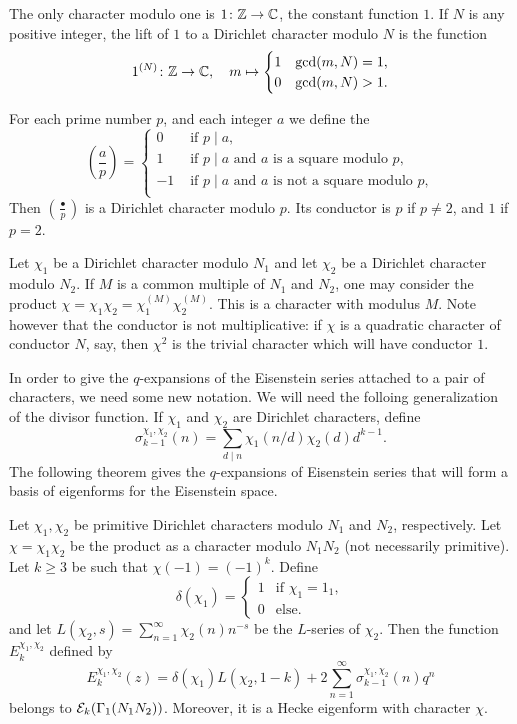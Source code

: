 \begin{example}
  The only character modulo one is $1\colon \mathbb{Z}\to\mathbb{C}$, the constant function $1$. If $N$ is any positive integer, the lift of $1$ to a Dirichlet character modulo $N$ is the function
\[
1^{(N)}\colon\mathbb{Z}\to\mathbb{C},\quad m\mapsto \begin{cases}1&\gcd(m,N)=1,\\0&\gcd(m,N)>1.
\end{cases}
\]
\end{example}
\begin{example}
  For each prime number $p$, and each integer $a$ we define the 
\[
\left(\frac a p\right)=\begin{cases}
0&\text{ if }p\mid a,\\
1&\text{ if }p\mid a\text{ and $a$ is a square modulo $p$},\\
-1&\text{ if }p\mid a\text{ and $a$ is not a square modulo $p$},\\
\end{cases}
\]
Then $\left(\frac\bullet p\right)$ is a Dirichlet character modulo $p$. Its conductor is $p$ if $p\neq 2$, and  $1$ if $p=2$.
\end{example}

\begin{example}
  Let $\chi_1$ be a Dirichlet character modulo $N_1$ and let $\chi_2$ be a Dirichlet character modulo $N_2$. If $M$ is a common multiple of $N_1$ and $N_2$, one may consider the product $\chi=\chi_1\chi_2 = \chi_1^{(M)}\chi_2^{(M)}$. This is a character with modulus $M$. Note however that the conductor is not multiplicative: if $\chi$ is a quadratic character of conductor $N$, say, then $\chi^2$ is the trivial character which will have conductor $1$.
\end{example}

In order to give the $q$-expansions of the Eisenstein series attached to a pair of characters, we need some new notation. We will need the folloing generalization of the divisor function. If $\chi_1$ and $\chi_2$ are Dirichlet characters, define
\[
\sigma_{k-1}^{\chi_1,\chi_2}(n)=\sum_{d\mid n}\chi_1(n/d)\chi_2(d)d^{k-1}.
\]
The following theorem gives the $q$-expansions of Eisenstein series that will form a basis of eigenforms for the Eisenstein space.
\begin{theorem}
\label{th:eisenstein-gamma1}
  Let $\chi_1,\chi_2$ be primitive Dirichlet characters modulo $N_1$ and $N_2$, respectively. Let $\chi=\chi_1\chi_2$ be the product as a character modulo $N_1N_2$ (not necessarily primitive). Let $k\geq 3$ be such that $\chi(-1)=(-1)^k$. Define
\[
\delta(\chi_1)=\begin{cases}
1&\text{if } \chi_1=1_1,\\
0&\text{else.}
\end{cases}
\]
and let $L(\chi_2,s)=\sum_{n=1}^\infty \chi_2(n)n^{-s}$ be the $L$-series of $\chi_2$. Then the function $E_k^{\chi_1,\chi_2}$ defined by
\[
E_k^{\chi_1,\chi_2}(z) = \delta(\chi_1)L(\chi_2,1-k) + 2\sum_{n=1}^\infty\sigma_{k-1}^{\chi_1,\chi_2}(n)q^n
\]
belongs to $\mathcal{E}_k(\Gamma_1(N_1N_2))$. Moreover, it is a Hecke eigenform with character $\chi$.
\end{theorem}

